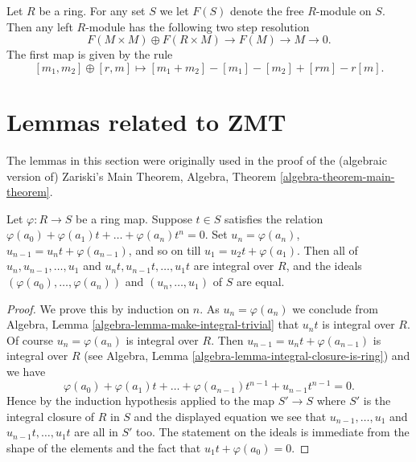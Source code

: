 \begin{remark}
\label{remark-projective-resolution}
Let $R$ be a ring.
For any set $S$ we let $F(S)$ denote the free $R$-module on $S$.
Then any left $R$-module has the following two step resolution
$$
F(M \times M) \oplus F(R \times M) \to F(M) \to M \to 0.
$$
The first map is given by the rule
$$
[m_1, m_2] \oplus [r, m] \mapsto [m_1 + m_2] - [m_1] - [m_2] + [rm] - r[m].
$$
\end{remark}


\section{Lemmas related to ZMT}
\label{section-ZMT}

\noindent
The lemmas in this section were originally used in the proof of the
(algebraic version of) Zariski's Main Theorem,
Algebra, Theorem \ref{algebra-theorem-main-theorem}.

\begin{lemma}
\label{lemma-make-integral-less-trivial}
Let $\varphi : R \to S$ be a ring map.
Suppose $t \in S$ satisfies the
relation $\varphi(a_0) + \varphi(a_1)t + \ldots + \varphi(a_n) t^n = 0$.
Set $u_n = \varphi(a_n)$, $u_{n-1} = u_n t + \varphi(a_{n-1})$,
and so on till $u_1 = u_2 t + \varphi(a_1)$.
Then all of $u_n, u_{n-1}, \ldots, u_1$ and
$u_nt, u_{n-1}t, \ldots, u_1t$ are integral over $R$,
and the ideals $(\varphi(a_0), \ldots, \varphi(a_n))$ and
$(u_n, \ldots, u_1)$ of $S$ are equal.
\end{lemma}

\begin{proof}
We prove this by induction on $n$. As $u_n = \varphi(a_n)$ we
conclude from
Algebra, Lemma \ref{algebra-lemma-make-integral-trivial}
that $u_nt$ is integral over $R$. Of course
$u_n = \varphi(a_n)$ is integral over $R$. Then
$u_{n - 1} = u_n t  + \varphi(a_{n - 1})$ is integral over $R$ (see
Algebra, Lemma \ref{algebra-lemma-integral-closure-is-ring})
and we have
$$
\varphi(a_0) + \varphi(a_1)t + \ldots + \varphi(a_{n - 1})t^{n - 1} +
u_{n - 1}t^{n - 1} = 0.
$$
Hence by the induction hypothesis applied to the map
$S' \to S$ where $S'$ is the integral closure of $R$ in $S$
and the displayed equation we see that
$u_{n-1}, \ldots, u_1$ and $u_{n-1}t, \ldots, u_1t$
are all in $S'$ too. The statement on the ideals is immediate from the
shape of the elements and the fact that $u_1t + \varphi(a_0) = 0$.
\end{proof}

